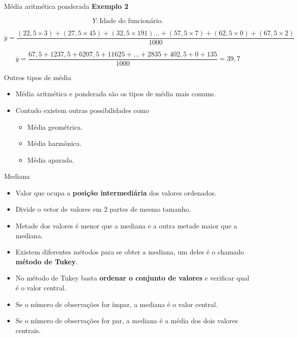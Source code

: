 \documentclass[
  ignorenonframetext,
  serif,
  professionalfont,
  usenames,
  dvipsnames,
  aspectratio = 169]{beamer}
\providecommand{\tightlist}{%
  \setlength{\itemsep}{0pt}\setlength{\parskip}{0pt}}
\renewcommand{\tightlist}{%
  \setlength{\itemsep}{0\baselineskip}
  \setlength{\parskip}{0.25\baselineskip}
}
\begin{document}
\begin{frame}{Média aritmética ponderada}
\label{muxe9dia-aritmuxe9tica-ponderada-4}
\textbf{Exemplo 2}

\[Y: \text{Idade do funcionário.}\]

\[\overline{y} = \dfrac{(22,5\times3)+(27,5\times45)+(32,5\times191)...+(57,5\times7)+(62,5\times0)+(67,5\times2)}{1000}\]

\[\overline{y} = \dfrac{67,5+1237,5+6207,5+11625+...+2835+402,5+0+135
}{1000}= 39,7\]
\end{frame}

\begin{frame}{Outros tipos de média}
\label{outros-tipos-de-muxe9dia}
\begin{itemize}
\tightlist
\item
  Média aritmética e ponderada são os tipos de média mais comuns.
\item
  Contudo existem outras possibilidades como

  \begin{itemize}
  \tightlist
  \item
    Média geométrica.
  \item
    Média harmônica.
  \item
    Média aparada.
  \end{itemize}
\end{itemize}
\end{frame}

\begin{frame}{Mediana}
\label{mediana}
\begin{itemize}
\item
  Valor que ocupa a \textbf{posição intermediária} dos valores
  ordenados.
\item
  Divide o vetor de valores em 2 partes de mesmo tamanho.
\item
  Metade dos valores é menor que a mediana e a outra metade maior que a
  mediana.
\item
  Existem diferentes métodos para se obter a mediana, um deles é o
  chamado \textbf{método de Tukey}.
\item
  No método de Tukey basta \textbf{ordenar o conjunto de valores} e
  verificar qual é o valor central.
\item
  Se o número de observações for ímpar, a mediana é o valor central.
\item
  Se o número de observações for par, a mediana é a média dos dois
  valores centrais.
\end{itemize}
\end{frame}
\end{document}
